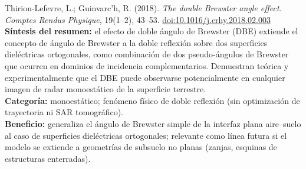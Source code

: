 \documentclass[11pt,a4paper]{report}
\begin{document}
\begin{enumerate}[label=\textbf{[E\arabic*]}, leftmargin=2.2cm, itemsep=10pt]
\item Thirion-Lefevre, L.; Guinvarc'h, R. (2018). \textit{The double
Brewster angle effect.} \emph{Comptes Rendus Physique}, 19(1--2), 43--53.
\href{https://doi.org/10.1016/j.crhy.2018.02.003}{doi:10.1016/j.crhy.2018.02.003}
\cite{thirion2018}\\
\textbf{Síntesis del resumen:} el efecto de doble ángulo de Brewster (DBE)
extiende el concepto de ángulo de Brewster a la doble reflexión sobre dos
superficies dieléctricas ortogonales, como combinación de dos
pseudo-ángulos de Brewster que ocurren en dominios de incidencia
complementarios. Demuestran teórica y experimentalmente que el DBE puede
observarse potencialmente en cualquier imagen de radar monoestático de la
superficie terrestre.\\
\textbf{Categoría:} monoestático; fenómeno físico de doble reflexión (sin
optimización de trayectoria ni SAR tomográfico).\\
\textbf{Beneficio:} generaliza el ángulo de Brewster simple de la interfaz
plana aire--suelo al caso de superficies dieléctricas ortogonales; relevante
como línea futura si el modelo se extiende a geometrías de subsuelo no
planas (zanjas, esquinas de estructuras enterradas).


\end{enumerate}
\end{document}
